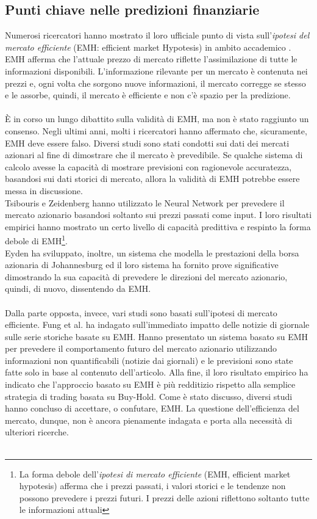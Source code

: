 \documentclass[a4paper,12pt]{report}
\begin{document}
\subsection{Punti chiave nelle predizioni finanziarie}
Numerosi ricercatori hanno mostrato il loro ufficiale punto di vista sull'\textit{ipotesi del mercato efficiente} (EMH: efficient market Hypotesis) in ambito accademico \cite{emh1}\cite{emh2}. EMH afferma che l'attuale prezzo di mercato riflette l'assimilazione di tutte le informazioni disponibili\cite{emh3}. L'informazione rilevante per un mercato è contenuta nei prezzi e, ogni volta che sorgono nuove informazioni, il mercato corregge se stesso e le assorbe, quindi, il mercato è efficiente e non c'è spazio per la predizione\cite{emh4}.\\~\\
È in corso un lungo dibattito sulla validità di EMH, ma non è stato raggiunto un consenso. Negli ultimi anni, molti i ricercatori hanno affermato che, sicuramente, EMH deve essere falso\cite{emh4}. Diversi studi sono stati condotti sui dati dei mercati azionari al fine di dimostrare che il mercato è prevedibile. Se qualche sistema di calcolo avesse la capacità di mostrare previsioni con ragionevole accuratezza, basandosi sui dati storici di mercato, allora la validità di EMH potrebbe essere messa in discussione.\\
Tsibouris e Zeidenberg\cite{emh0} hanno utilizzato le Neural Network per prevedere il mercato azionario basandosi soltanto sui prezzi passati come input. I loro risultati empirici hanno mostrato un certo livello di capacità predittiva e respinto la forma debole di EMH\footnote{La forma debole dell'\textit{ipotesi di mercato efficiente} (EMH, efficient market hypotesis) afferma che i prezzi passati, i valori storici e le tendenze non possono prevedere i prezzi futuri. I prezzi delle azioni riflettono soltanto tutte le informazioni attuali}.\\
Eyden \cite{nn-eyden} ha sviluppato, inoltre, un sistema che modella le prestazioni della borsa azionaria di Johannesburg ed il loro sistema ha fornito prove significative dimostrando la sua capacità di prevedere le direzioni del mercato azionario, quindi, di nuovo, dissentendo da EMH.\\~\\
Dalla parte opposta, invece, vari studi sono basati sull'ipotesi di mercato efficiente. Fung et al. \cite{news-nn} ha indagato sull'immediato impatto delle notizie di giornale sulle serie storiche basate su EMH. Hanno presentato un sistema basato su EMH per prevedere il comportamento futuro del mercato azionario utilizzando informazioni non quantificabili (notizie dai giornali) e le previsioni sono state fatte solo in base al contenuto dell'articolo. Alla fine, il loro risultato empirico ha indicato che l'approccio basato su EMH è più redditizio rispetto alla semplice strategia di trading basata su Buy-Hold. Come è stato discusso, diversi studi hanno concluso di accettare, o confutare, EMH. La questione dell'efficienza del mercato, dunque, non è ancora pienamente indagata e porta alla necessità di ulteriori ricerche.\\~\\
\end{document}
